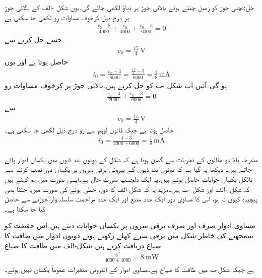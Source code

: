 حل:نچلی جوڑ کو زمین چنتے ہوئے بالائی جوڑ پر دباؤ  لکھی جائے گی۔یوں  شکل -الف کے بالائی جوڑ پر درج ذیل کرخوف مساوات رو لکھی جا سکتی ہے
\begin{align*}
\frac{v_0-8}{4000}+\frac{v_0}{4000}+\frac{v_0-3}{6000}=0
\end{align*}
جسے حل کرنے سے
\begin{align*}
v_0=\frac{15}{4}\, \si{\volt}
\end{align*}
حاصل ہوتا ہے اور یوں
\begin{align*}
i_0=\frac{v_0-3}{6000}=\frac{\frac{15}{4}-3}{6000}=\frac{1}{8}\,\si{\milli\ampere}
\end{align*}
ہو گی۔آئیں اب شکل  -ب کو حل کرتے ہیں۔بالائی جوڑ پر کرخوف مساوات رو
\begin{align*}
\frac{v_0-4}{2000}+\frac{v_0-3}{6000}=0
\end{align*}
سے
\begin{align*}
v_0=\frac{15}{4}\, \si{\volt}
\end{align*}
حاصل ہوتا ہے جبکہ قانون اوہم سے رو درج ذیل لکھی جا سکتی ہے۔
\begin{align*}
i_0=\frac{4-3}{2000+6000}=\frac{1}{8}\,\si{\milli\ampere}
\end{align*}

مندرجہ بالا دو مثالوں کے تجربات سے گمان ہوتا ہے کہ شکل  کے دونوں بند ڈبوں میں یکساں ادوار پائے جاتے ہیں۔ دیکھا یہ گیا ہے کہ دونوں بند ڈبوں کے بیرونی برقی سروں پر یکساں دور نصب کرنے سے بالکل یکساں جوابات حاصل ہوتے ہیں۔یہ ایک دلچسپ صورت حال ہے۔ایسی صورت میں ہم کہتے ہیں کہ شکل -الف اور شکل -ب  ہیں۔مزید یہ کہ شکل-الف کا دور، خطی ہونے کی صورت میں، جتنا بھی پیچیدہ کیوں نہ ہو، اس کا مساوی دور ایک عدد منبع اور ایک عدد مزاحمت سلسلہ وار جوڑنے سے حاصل کیا جا سکتا ہے۔

مساوی ادوار صرف اور صرف برقی سروں پر یکساں جوابات دیتے ہیں۔اس حقیقت کو سمجھنے کی خاطر شکل  میں برقی سرے کھلے رکھتے ہوئے دونوں ادوار میں طاقت کا ضیاع دریافت کرتے ہیں۔شکل-الف میں طاقت کا ضیاع
\begin{align*}
\frac{8^2}{4000+4000}=\SI{8}{\milli\watt}
\end{align*}
ہے جبکہ شکل-ب میں طاقت کا ضیاع  ہے۔مساوی ادوار کے اندرونی متغیرات عموماً یکساں نہیں ہوتے۔

